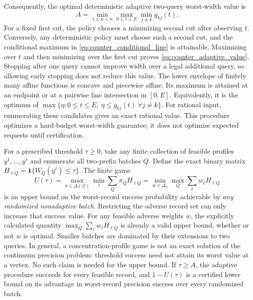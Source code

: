 Consequently, the optimal deterministic adaptive two-query worst-width value
is
\begin{equation}\label{eq:counter_adaptive_value}
 A=\min_{1\leq k<n}\max_{0\leq t\leq E}\min_{j\ne k}g_{kj}(t).
\end{equation}
For a fixed first cut, the policy chooses a minimizing second cut after
observing $t$.  Conversely, any deterministic policy must choose such a
second cut, and the conditional maximum in
\eqref{eq:counter_conditional_line} is attainable.  Maximizing over $t$ and
then minimizing over the first cut proves \eqref{eq:counter_adaptive_value}.
Stopping after one query cannot improve width over a legal additional query,
so allowing early stopping does not reduce this value.  The lower envelope
of finitely many affine functions is concave and piecewise affine.  Its
maximum is attained at an endpoint or at a pairwise line intersection in
$[0,E]$.  Equivalently, it is the optimum of
$\max\{\eta:0\leq t\leq E,\ \eta\leq g_{kj}(t)\ \forall j\ne k\}$.
For rational input, enumerating these candidates gives an exact rational
value.  This procedure optimizes a hard-budget worst-width guarantee; it
does not optimize expected requests until certification.

For a prescribed threshold $\tau\geq0$, take any finite collection of
feasible profiles $y^1,\ldots,y^s$ and enumerate all two-prefix batches $Q$.
Define the exact binary matrix
$H_{\ell Q}=\mathbf1\{W_Q(y^\ell)\leq\tau\}$.
The finite game
\begin{equation}\label{eq:counter_batch_upper}
 U(\tau)=\max_{\pi\in\Delta(\mathcal Q)}\min_\ell
             \sum_Q\pi_QH_{\ell Q}
 =\min_{w\in\Delta_s}\max_Q\sum_\ell w_\ell H_{\ell Q}
\end{equation}
is an upper bound on the worst-record success probability achievable by
\emph{any randomized nonadaptive batch}.  Restricting the adverse record
set can only increase that success value.  For any feasible adverse weights
$w$, the explicitly calculated quantity
$\max_Q\sum_\ell w_\ell H_{\ell Q}$ is already a valid upper bound, whether
or not $w$ is optimal.  Smaller batches are dominated by their extensions
to two queries.  In general, a concentration-profile game is not an exact
solution of the continuum precision problem: threshold success need not
attain its worst value at a vertex.  No such claim is needed for the upper
bound.  If $\tau\geq A$, the adaptive procedure succeeds for every feasible
record, and $1-U(\tau)$ is a certified lower bound on its advantage in
worst-record precision success over every randomized batch.

